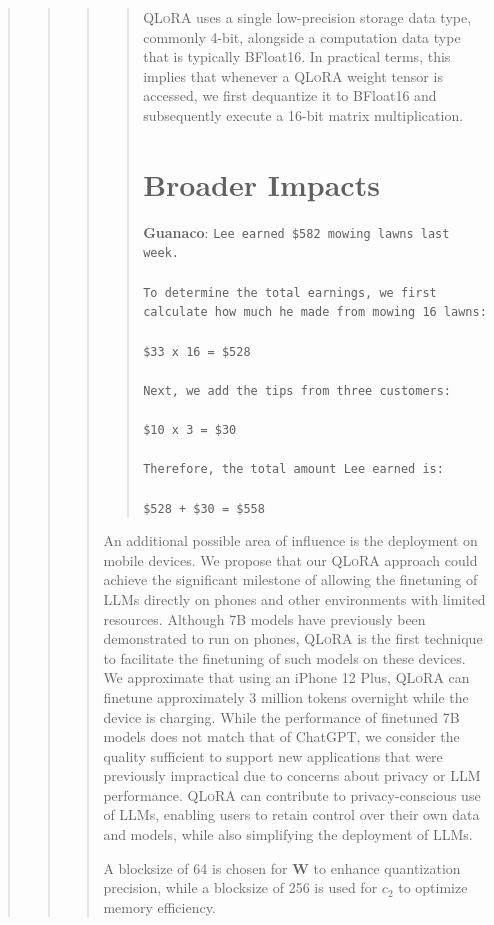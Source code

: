 \begin{quote}
\begin{quote}
\begin{quote}
\begin{quote}
\textsc{QLoRA} uses a single low-precision storage data type, commonly 4-bit, alongside a computation data type that is typically BFloat16. In practical terms, this implies that whenever a \textsc{QLoRA} weight tensor is accessed, we first dequantize it to BFloat16 and subsequently execute a 16-bit matrix multiplication.

\section{Broader Impacts}

    \textbf{Guanaco}: \texttt{Lee earned \$582 mowing lawns last week. \\ \\ To determine the total earnings, we first calculate how much he made from mowing 16 lawns: \\ \\  \$33 x 16 = \$528 \\ \\ Next, we add the tips from three customers: \\  \\ \$10 x 3 = \$30 \\ \\ Therefore, the total amount Lee earned is: \\ \\ \$528 + \$30 = \$558}
\end{quote}

An additional possible area of influence is the deployment on mobile devices. We propose that our \textsc{QLoRA} approach could achieve the significant milestone of allowing the finetuning of LLMs directly on phones and other environments with limited resources. Although 7B models have previously been demonstrated to run on phones, \textsc{QLoRA} is the first technique to facilitate the finetuning of such models on these devices. We approximate that using an iPhone 12 Plus, \textsc{QLoRA} can finetune approximately 3 million tokens overnight while the device is charging. While the performance of finetuned 7B models does not match that of ChatGPT, we consider the quality sufficient to support new applications that were previously impractical due to concerns about privacy or LLM performance. \textsc{QLoRA} can contribute to privacy-conscious use of LLMs, enabling users to retain control over their own data and models, while also simplifying the deployment of LLMs.

A blocksize of 64 is chosen for $\mathbf{W}$ to enhance quantization precision, while a blocksize of 256 is used for $c_2$ to optimize memory efficiency.


\end{quote}
\end{quote}
\end{quote}
